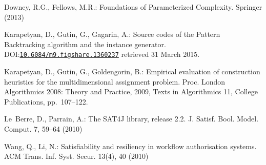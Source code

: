 \documentclass[runningheads,proof]{llncs}
\begin{document}
\begin{thebibliography}{10}
Downey, R.G., Fellows, M.R.: Foundations of Parameterized Complexity. Springer (2013)







Karapetyan, D., Gutin, G., Gagarin, A.:
Source codes of the Pattern Backtracking algorithm and the instance generator.  DOI:\href{http://dx.doi.org/10.6084/m9.figshare.1360237}{\texttt{10.6084/m9.figshare.1360237}} retrieved 31 March 2015.

Karapetyan, D., Gutin, G., Goldengorin, B.: Empirical evaluation of construction heuristics for the multidimensional assignment problem.  Proc. London Algorithmics 2008: Theory and Practice, 2009, Texts in Algorithmics 11, College Publications, pp.\ 107--122.

Le~Berre, D., Parrain, A.: The {SAT4J} library, release 2.2. J. Satisf. Bool.
  Model. Comput.  7,  59--64 (2010)







Wang, Q., Li, N.: Satisfiability and resiliency in workflow authorisation
  systems. ACM Trans. Inf. Syst. Secur.  13(4), 40 (2010)

\end{thebibliography}
\end{document}
